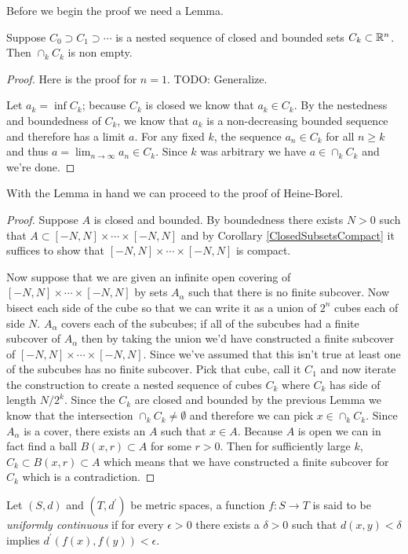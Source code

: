 Before we begin the proof we need a Lemma.
\begin{lem}Suppose $C_0 \supset C_1 \supset \cdots$ is a nested
  sequence of closed and bounded sets $C_k \subset \mathbb{R}^n$.  Then
  $\cap_k C_k$ is non empty.
\end{lem}
\begin{proof}Here is the proof for $n=1$.  TODO: Generalize.

Let $a_k = \inf C_k$; because $C_k$ is closed we know that $a_k \in
C_k$.  By the nestedness and boundedness of $C_k$, we know that $a_k$
is a non-decreasing bounded sequence and therefore has a limit $a$.
For any fixed $k$, the sequence $a_n \in C_k$ for all $n \geq k$ and
thus $a=\lim_{n \to \infty} a_n \in C_k$.  Since $k$ was arbitrary we
have $a \in \cap_k C_k$ and we're done.
\end{proof}
With the Lemma in hand we can proceed to the proof of Heine-Borel.
\begin{proof}
Suppose $A$ is closed and bounded.  By boundedness there exists $N>0$
such that $A \subset [-N,N] \times \cdots \times [-N,N]$ and by
Corollary \ref{ClosedSubsetsCompact} it suffices to show that $ [-N,N]
\times \cdots \times [-N,N]$ is compact.

Now suppose that we are given an infinite open covering of $ [-N,N]
\times \cdots \times [-N,N]$ by sets $A_\alpha$ such that there is no
finite subcover.  Now bisect each side of the cube so that we can
write it as a union of $2^n$ cubes each of side $N$.  $A_\alpha$
covers each of the subcubes; if all of the subcubes had a finite
subcover of $A_\alpha$ then by taking the union we'd have constructed
a finite subcover of $ [-N,N]
\times \cdots \times [-N,N]$.  Since we've assumed that this isn't
true at least one of the subcubes has no finite subcover.   Pick that
cube, call it $C_1$ and now iterate the construction to create a
nested sequence of cubes $C_k$ where $C_k$ has side of length
$N/2^k$.  Since the $C_k$ are closed and bounded by the previous Lemma
we know that the intersection $\cap_k C_k \neq \emptyset$ and
therefore we can pick $x \in \cap_k C_k$.  Since $A_\alpha$ is a
cover, there exists an $A$ such that $x \in A$.  Because $A$ is open
we can in fact find a ball $B(x,r) \subset A$ for some $r > 0$.  Then
for sufficiently large $k$, $C_k \subset B(x,r) \subset A$ which means
that we have constructed a finite subcover for $C_k$ which is a contradiction.
\end{proof}

\begin{defn}Let $(S,d)$ and $(T, d^\prime)$ be metric spaces, a
  function $f : S \to T$ is said to be \emph{uniformly continuous} if
  for every $\epsilon > 0$ there exists a $\delta > 0$ such that
  $d(x,y) < \delta$ implies $d^\prime(f(x), f(y)) < \epsilon$.
\end{defn}

